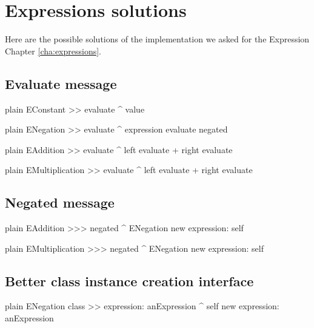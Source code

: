 \documentclass[10pt,twoside,english]{_support/latex/sbabook/sbabook}
\begin{document}
\frontmatter
\pagestyle{plain}

\tableofcontents*
\clearpage\listoffigures

\mainmatter

\chapter{Expressions solutions}\label{cha:expressionssolutions}
Here are the possible solutions of the implementation we asked for the Expression Chapter \ref{cha:expressions}.
\section{Evaluate message}
\begin{displaycode}{plain}
EConstant >> evaluate
	^ value
\end{displaycode}

\begin{displaycode}{plain}
ENegation >> evaluate
	^ expression evaluate negated
\end{displaycode}

\begin{displaycode}{plain}
EAddition >> evaluate
	^ left evaluate + right evaluate
\end{displaycode}

\begin{displaycode}{plain}
EMultiplication  >> evaluate
	^ left evaluate + right evaluate
\end{displaycode}
\section{Negated message}
\begin{displaycode}{plain}
EAddition >>> negated 
	^ ENegation new expression: self
\end{displaycode}

\begin{displaycode}{plain}
EMultiplication >>> negated 
	^ ENegation new expression: self
\end{displaycode}
\section{Better class instance creation interface}
\begin{displaycode}{plain}
ENegation class >> expression: anExpression
	^ self new expression: anExpression
\end{displaycode}
\end{document}
